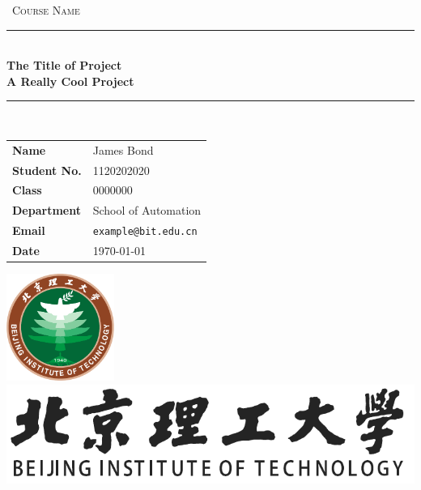 \documentclass[12pt,english, openany]{book}
\begin{document}
	
	
	\begin{titlepage}
		\clearpage\thispagestyle{empty}
		\centering
		\vspace{1cm}
		
		{\
			\textsc{Course Name}
		}
		\vspace{2.5cm}
		
		\rule{\linewidth}{2mm} \\[0.5cm]
		{ \Huge \bfseries The Title of Project\\[0.2em]
			A Really Cool Project}\\[0.5cm]
		\rule{\linewidth}{0.6mm} \\[3.4cm]
		
		\hspace{2cm}
		\begin{tabular}{l p{5cm}}
			\textbf{Name} & James Bond \\[10pt]
			\textbf{Student No.} & 1120202020 \\[10pt]
			\textbf{Class} & 0000000 \\[10pt]
			\textbf{Department} & School of Automation \\[10pt]
			\textbf{Email} & \texttt{example@bit.edu.cn} \\[10pt]
			\textbf{Date} & \today \\            
		\end{tabular}
		
		
		\vfill
		\centering \includegraphics[height=3.5cm]{bit_logo.pdf}\\ %
		\centering \includegraphics[scale=0.4]{logo_slogan.pdf}
		\vspace{0.5cm}
		
		
		
		
		\pagebreak
		
	\end{titlepage}
	
\end{document}
